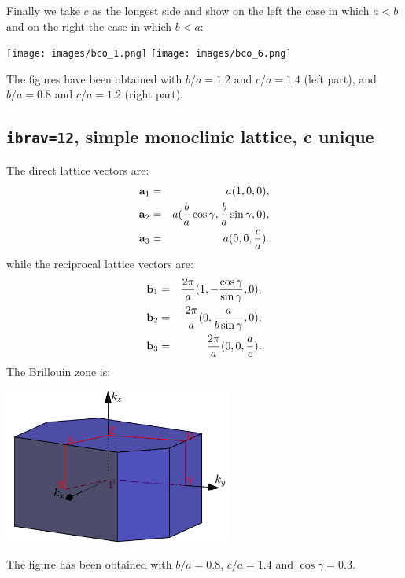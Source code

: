 \documentclass[12pt,a4paper]{article}
\begin{document}
Finally we take $c$ as the longest side and show on the left the case in 
which $a<b$ and on the right the case in which $b<a$:
\begin{center}
\texttt{[image: images/bco\_1.png]} \hspace{1.0 cm}
\texttt{[image: images/bco\_6.png]}
\end{center}
The figures have been obtained with $b/a=1.2$ and $c/a=1.4$ (left part), and
$b/a=0.8$ and $c/a=1.2$ (right part).

\subsection{\texttt{ibrav=12}, simple monoclinic lattice, c unique}
The direct lattice vectors are:
\begin{eqnarray}
{\bf a}_1 &=& a (1, 0, 0), \nonumber \\
{\bf a}_2 &=& a ({b \over a} \cos{\gamma}, {b \over a}\sin{\gamma}, 0), \nonumber \\
{\bf a}_3 &=& a (0, 0, {c \over a}). 
\nonumber
\end{eqnarray}
while the reciprocal lattice vectors are:
\begin{eqnarray}
{\bf b}_1 &=& {2\pi \over a} (1, -{\cos{\gamma}\over \sin{\gamma}}, 0), \nonumber \\
{\bf b}_2 &=& {2\pi \over a} (0, {a \over b \sin{\gamma}}, 0), \nonumber \\
{\bf b}_3 &=& {2\pi \over a} (0, 0, {a \over c}). \nonumber
\end{eqnarray}
The Brillouin zone is: 
\begin{center}
\includegraphics[width=7.5cm,angle=0]{images/monoc.png} 
\end{center}
The figure has been obtained with $b/a=0.8$, $c/a=1.4$ and $\cos{\gamma}=0.3$.
\end{document}
